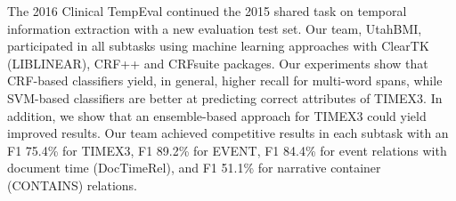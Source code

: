 The 2016 Clinical TempEval continued the 2015 shared task on temporal information extraction with a new evaluation  test set. Our team, UtahBMI,  participated in all subtasks using machine learning approaches with ClearTK (LIBLINEAR), CRF++ and CRFsuite packages. Our experiments show that CRF-based classifiers yield, in general, higher recall for multi-word spans, while SVM-based classifiers are better at predicting correct attributes of TIMEX3. In addition, we show that an ensemble-based approach for TIMEX3 could yield improved results. Our team achieved competitive results in each subtask with an  F1 75.4\% for TIMEX3, F1 89.2\% for EVENT, F1 84.4\% for event relations with document time (DocTimeRel), and F1 51.1\% for narrative container (CONTAINS) relations.
